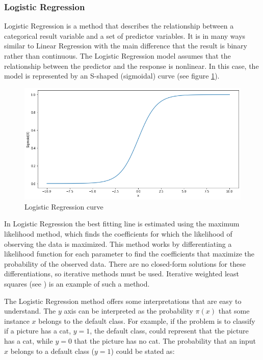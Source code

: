 \subsubsection{Logistic Regression}

Logistic Regression is a method that describes the relationship between a categorical result variable and a set of predictor variables. It is in many ways similar to Linear Regression with the main difference that the result is binary rather than continuous. The Logistic Regression model assumes that the relationship between the predictor and the response is nonlinear. In this case, the model is represented by an S-shaped (sigmoidal) curve (see figure \ref{fig:sig}).

\begin{figure}[htb]
	\centering
  	\includegraphics[scale=.5]{Imagens/sigmoid.png}
  	\caption{Logistic Regression curve}
  	\label{fig:sig}
\end{figure}

In Logistic Regression the best fitting line is estimated using the maximum likelihood method, which finds the coefficients for which the likelihood of observing the data is maximized. This method works by differentiating a likelihood function for each parameter to find the coefficients that maximize the probability of the observed data. There are no closed-form solutions for these differentiations, so iterative methods must be used. Iterative weighted least squares (see \cite{nelder1972generalized}) is an example of such a method.

The Logistic Regression method offers some interpretations that are easy to understand. The $y$ axis can be interpreted as the probability $\pi(x)$ that some instance $x$ belongs to the default class. For example, if the problem is to classify if a picture has a cat, $y=1$, the default class, could represent that the picture has a cat, while $y=0$ that the picture has no cat. The probability that an input $x$ belongs to a default class ($y=1$) could be stated as:

